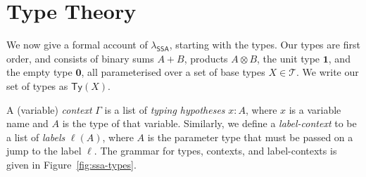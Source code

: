 \documentclass[acmsmall,screen,review]{acmart}
\newcommand{\mc}[1]{\ensuremath{\mathcal{#1}}}
\newcommand{\mb}[1]{\ensuremath{\mathbf{#1}}}
\newcommand{\ms}[1]{\ensuremath{\mathsf{#1}}}
\newcommand{\bhyp}[2]{#1 : #2}
\newcommand{\lhyp}[2]{#1(#2)}
\newcommand{\isotopessa}{\(\lambda_{\ms{SSA}}\)}
\begin{document}

 
\section{Type Theory}

\label{sec:typing}

We now give a formal account of \isotopessa{}, starting with the types. Our types are first order,
and consists of binary sums $A + B$, products $A \otimes B$, the unit type $\mathbf{1}$, and the
empty type $\mb{0}$, all parameterised over a set of base types $X \in \mc{T}$. We write our set of
types as $\ms{Ty}(X)$. 

A (variable) \textit{context} $\Gamma$ is a list of \textit{typing hypotheses} $\bhyp{x}{A}$, where
$x$ is a variable name and $A$ is the type of that variable. Similarly, we define a
\textit{label-context} to be a list of \textit{labels} $\lhyp{\ell}{A}$, where $A$ is the parameter
type that must be passed on a jump to the label $\ell$. The grammar for types, contexts, and
label-contexts is given in Figure~\ref{fig:ssa-types}.
\end{document}
